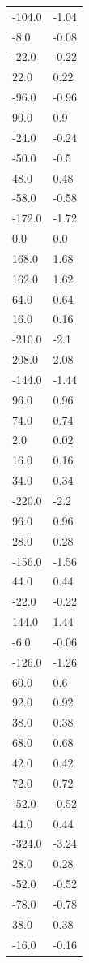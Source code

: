 \begin{longtable}{ll}
-104.0 & -1.04 \\
-8.0 & -0.08 \\
-22.0 & -0.22 \\
22.0 & 0.22 \\
-96.0 & -0.96 \\
90.0 & 0.9 \\
-24.0 & -0.24 \\
-50.0 & -0.5 \\
48.0 & 0.48 \\
-58.0 & -0.58 \\
-172.0 & -1.72 \\
0.0 & 0.0 \\
168.0 & 1.68 \\
162.0 & 1.62 \\
64.0 & 0.64 \\
16.0 & 0.16 \\
-210.0 & -2.1 \\
208.0 & 2.08 \\
-144.0 & -1.44 \\
96.0 & 0.96 \\
74.0 & 0.74 \\
2.0 & 0.02 \\
16.0 & 0.16 \\
34.0 & 0.34 \\
-220.0 & -2.2 \\
96.0 & 0.96 \\
28.0 & 0.28 \\
-156.0 & -1.56 \\
44.0 & 0.44 \\
-22.0 & -0.22 \\
144.0 & 1.44 \\
-6.0 & -0.06 \\
-126.0 & -1.26 \\
60.0 & 0.6 \\
92.0 & 0.92 \\
38.0 & 0.38 \\
68.0 & 0.68 \\
42.0 & 0.42 \\
72.0 & 0.72 \\
-52.0 & -0.52 \\
44.0 & 0.44 \\
-324.0 & -3.24 \\
28.0 & 0.28 \\
-52.0 & -0.52 \\
-78.0 & -0.78 \\
38.0 & 0.38 \\
-16.0 & -0.16 \\

\end{longtable}
